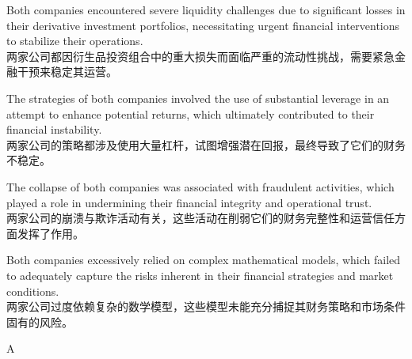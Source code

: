 \documentclass{article}
\begin{document}
\begin{choices}
    \item Both companies encountered severe liquidity challenges due to significant losses in their derivative investment portfolios, necessitating urgent financial interventions to stabilize their operations. \\
    两家公司都因衍生品投资组合中的重大损失而面临严重的流动性挑战，需要紧急金融干预来稳定其运营。
    \item The strategies of both companies involved the use of substantial leverage in an attempt to enhance potential returns, which ultimately contributed to their financial instability. \\
    两家公司的策略都涉及使用大量杠杆，试图增强潜在回报，最终导致了它们的财务不稳定。
    \item The collapse of both companies was associated with fraudulent activities, which played a role in undermining their financial integrity and operational trust. \\
    两家公司的崩溃与欺诈活动有关，这些活动在削弱它们的财务完整性和运营信任方面发挥了作用。
    \item Both companies excessively relied on complex mathematical models, which failed to adequately capture the risks inherent in their financial strategies and market conditions. \\  
    两家公司过度依赖复杂的数学模型，这些模型未能充分捕捉其财务策略和市场条件固有的风险。
\end{choices}

\begin{correctanswer}
    A
\end{correctanswer}
\end{document}
